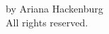 \clearpage

\thispagestyle{empty}
\vspace*{\fill}
\begin{center}
 by Ariana Hackenburg\\
All rights reserved.
\end{center}
\vspace*{\fill}

\clearpage

\doublespacing

\pagestyle{fancy}%
\fancyhead[C]{}
\renewcommand{\headrulewidth}{0.4pt}%

\tableofcontents
\clearpage

\listoffigures
\setcounter{tocdepth}{3} 

\clearpage
\renewcommand{\thepage}{\arabic{page}}
\setcounter{page}{1}

